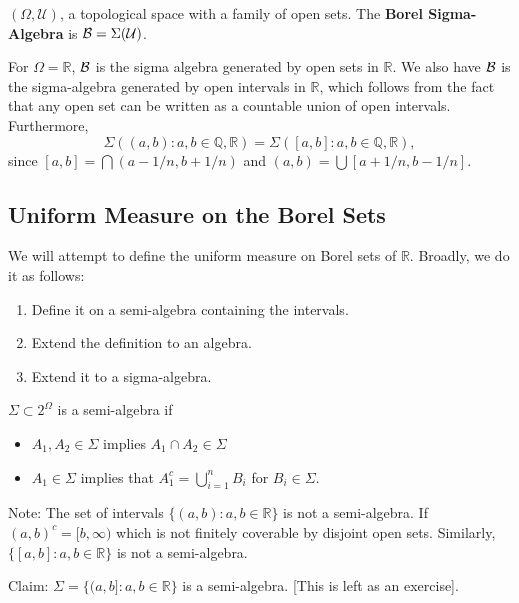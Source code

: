 \documentclass[11pt]{scrartcl}
\newcommand{\Q}{\mathbb{Q}}
\newcommand{\R}{\mathbb{R}}
\newcommand{\cU}{\mathcal{U}}
\begin{document}
\begin{definition} $(\Omega, \cU)$, a topological space with a family of open sets.  The \textbf{Borel Sigma-Algebra} is $\SB = \Sigma(\cU)$. 
\end{definition}

\begin{example} For $\Omega = \R$, $\mathcal B$ is the sigma algebra generated by open sets in $\R$.  We also have $\mathcal B$ is the sigma-algebra generated by open intervals in $\R$, which follows from the fact that any open set can be written as a countable union of open intervals.  Furthermore,
$$\Sigma((a, b): a, b\in \Q, \R) = \Sigma([a, b]: a, b \in \Q, \R),$$
since $[a, b] = \bigcap (a-1/n, b+1/n)$ and $(a, b) = \bigcup [a+1/n, b-1/n]$.
\end{example}

\subsection{Uniform Measure on the Borel Sets}
We will attempt to define the uniform measure on Borel sets of $\R$.  Broadly, we do it as follows:
\begin{enumerate}
\item Define it on a semi-algebra containing the intervals.
\item Extend the definition to an algebra.
\item Extend it to a sigma-algebra.
\end{enumerate}
\begin{definition} $\Sigma \subset 2^\Omega$ is a semi-algebra if
\begin{itemize}
\item $A_1, A_2 \in \Sigma$ implies $A_1\cap A_2 \in \Sigma$
\item $A_1 \in \Sigma$ implies that $A_1^c = \bigcup_{i=1}^n B_i$ for $B_i \in \Sigma$.
\end{itemize}
\end{definition}
Note:  The set of intervals $\{(a, b): a, b \in \R\}$ is not a semi-algebra.  If $(a, b)^c = [b, \infty)$ which is not finitely coverable by disjoint open sets. Similarly, $\{[a, b]: a, b \in \R\}$ is not a semi-algebra.  

Claim: $\Sigma = \{(a, b]: a, b \in \R\}$ is a semi-algebra.  [This is left as an exercise].
\end{document}
